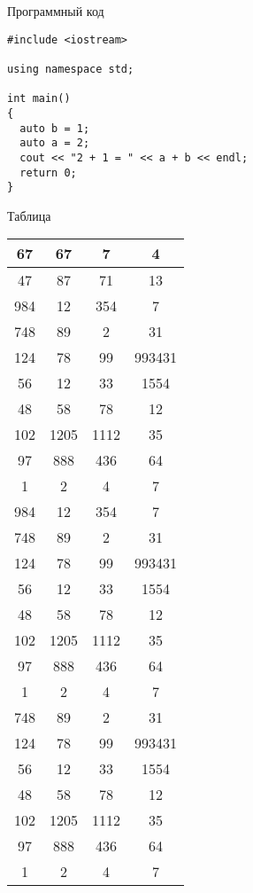 \documentclass[rusmathsym, eqnumwithinsec, amspack, hyperref]{bomgost}
\begin{document}
\appendix

\begin{gostappendix}{Программный код}
\lstset{language=[11]c++,basicstyle=\ttfamily, showstringspaces=false}

\begin{lstlisting}
#include <iostream>

using namespace std;

int main()
{
  auto b = 1;
  auto a = 2;
  cout << "2 + 1 = " << a + b << endl;
  return 0;
}
\end{lstlisting}
\end{gostappendix}


\begin{gostappendix}{Таблица}
\begin{table}[H]
\centering
\begin{tabular}{|c|c|c|c|}
\hline 
67 & 67 & 7 & 4 \\ 
\hline 
47 & 87 & 71 & 13 \\ 
\hline 
984 & 12 & 354 & 7 \\ 
\hline 
748 & 89 & 2 & 31 \\ 
\hline 
124 & 78 & 99 & 993431 \\ 
\hline 
56 & 12 & 33 & 1554 \\ 
\hline 
48 & 58 & 78 & 12 \\ 
\hline 
102 & 1205 & 1112 & 35 \\ 
\hline 
97 & 888 & 436 & 64 \\ 
\hline 
1 & 2 & 4 & 7 \\
\hline
984 & 12 & 354 & 7 \\ 
\hline 
748 & 89 & 2 & 31 \\ 
\hline 
124 & 78 & 99 & 993431 \\ 
\hline 
56 & 12 & 33 & 1554 \\ 
\hline 
48 & 58 & 78 & 12 \\ 
\hline 
102 & 1205 & 1112 & 35 \\ 
\hline 
97 & 888 & 436 & 64 \\ 
\hline 
1 & 2 & 4 & 7 \\
\hline
748 & 89 & 2 & 31 \\ 
\hline 
124 & 78 & 99 & 993431 \\ 
\hline 
56 & 12 & 33 & 1554 \\ 
\hline 
48 & 58 & 78 & 12 \\ 
\hline 
102 & 1205 & 1112 & 35 \\ 
\hline 
97 & 888 & 436 & 64 \\ 
\hline 
1 & 2 & 4 & 7 \\ 
\hline 
\end{tabular} 
\end{table}
\end{gostappendix}
\end{document}
